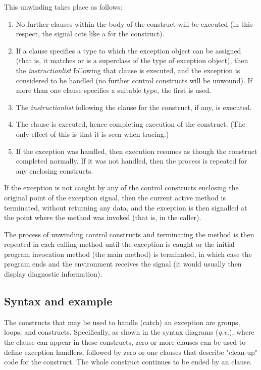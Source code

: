 This unwinding takes place as follows:
\begin{enumerate}
\item No further clauses within the body of the construct will be executed
(in this respect, the signal acts like a  for the
construct).
\item If a  clause specifies a type to which
the exception object can be assigned (that is, it matches or is a
superclass of the type of exception object), then the
\emph{instructionlist} following that clause is executed, and the
exception is considered to be handled (no further control constructs
will be unwound).
If more than one  clause specifies a suitable type, the
first is used.
\item The \emph{instructionlist} following the  clause
for the construct, if any, is executed.
\item The  clause is executed, hence completing execution of
the construct.
(The only effect of this is that it is seen when tracing.)
\item 
If the exception was handled, then execution resumes as though the
construct completed normally.  If it was not handled, then the process
is repeated for any enclosing constructs.
\end{enumerate}
 
If the exception is not caught by any of the control constructs
enclosing the original point of the exception signal, then
the current active method is terminated, without returning any data, and
the exception is then signalled at the point where the method was
invoked (that is, in the caller).
 
The process of unwinding control constructs and terminating the method
is then repeated in each calling method until the exception is caught or
the initial program invocation method (the main method) is terminated,
in which case the program ends and the environment receives the signal
(it would usually then display diagnostic information).
\subsection{Syntax and example}
 
The constructs that may be used to handle (catch) an exception are
 groups,  loops, and  constructs.
Specifically, as shown in the syntax diagrams (\emph{q.v.}), where the
 clause can appear in these constructs, zero or more
 clauses can be used to define exception handlers,
followed by zero or one  clauses that describe
"clean-up" code for the construct.
The whole construct continues to be ended by an  clause.
 
